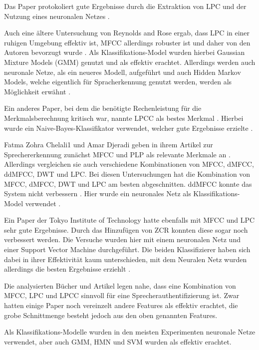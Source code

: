 Das Paper  protokoliert gute Ergebnisse durch die Extraktion von LPC und der Nutzung eines neuronalen Netzes \autocite[vgl.][S. 9]{kumar_rajeev_multilingual_nodate}.

Auch eine ältere Untersuchung von Reynolds and Rose ergab, dass LPC in einer ruhigen Umgebung effektiv ist, MFCC allerdings robuster ist und daher von den Autoren bevorzugt wurde \autocite[vgl.][S. 2f]{reynolds_robust_1995}.
Als Klassifikations-Model wurden hierbei Gaussian Mixture Models (GMM) genutzt und als effektiv erachtet.
Allerdings werden auch neuronale Netze, als ein neueres Modell, aufgeführt und auch Hidden Markov Models, welche eigentlich für Spracherkennung genutzt werden, werden als Möglichkeit erwähnt \autocite[vgl.][S. 2f, 11]{reynolds_robust_1995}.

Ein anderes Paper, bei dem die benötigte Rechenleistung für die Merkmalsberechnung kritisch war, nannte LPCC als bestes Merkmal \autocite[vgl.][S. 7]{thullier_text-independent_2017}.
Hierbei wurde ein Naive-Bayes-Klassifikator verwendet, welcher gute Ergebnisse erzielte \autocite[vgl.][S. 18f]{thullier_text-independent_2017}.

Fatma Zohra Chelali1 und Amar Djeradi geben in ihrem Artikel zur Sprechererkennung zunächst MFCC und PLP als relevante Merkmale an \autocite[vgl.][S. 276]{chelali_text_2017}.
Allerdings vergleichen sie auch verschiedene Kombinationen von MFCC, dMFCC, ddMFCC, DWT und LPC.
Bei diesen Untersuchungen hat die Kombination von MFCC, dMFCC, DWT und LPC am besten abgeschnitten.
ddMFCC konnte das System nicht verbessern \autocite[vgl.][S. 276, 739]{chelali_text_2017}.
Hier wurde ein neuronales Netz als Klassifikations-Model verwendet \autocite[vgl.][S. 735]{chelali_text_2017}.

Ein Paper der Tokyo Institute of Technology hatte ebenfalls mit MFCC und LPC sehr gute Ergebnisse.
Durch das Hinzufügen von ZCR konnten diese sogar noch verbessert werden.
Die Versuche wurden hier mit einem neuronalen Netz und einer Support Vector Machine durchgeführt.
Die beiden Klassifizierer haben sich dabei in ihrer Effektivität kaum unterschieden, mit dem Neuralen Netz wurden allerdings die besten Ergebnisse erziehlt \autocite[vgl.][S. 4]{neha_chauhan_2019_2019}.

Die analysierten Bücher und Artikel legen nahe, dass eine Kombination von MFCC, LPC und LPCC sinnvoll für eine Sprecherauthentifizierung ist.
Zwar hatten einige Paper noch vereinzelt andere Features als effektiv erachtet, die grobe Schnittmenge besteht jedoch aus den oben genannten Features.

Als Klassifikations-Modelle wurden in den meisten Experimenten neuronale Netze verwendet, aber auch GMM, HMN und SVM wurden als effektiv erachtet.